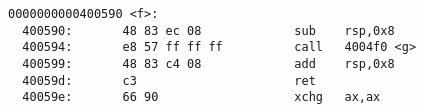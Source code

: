 \begin{lstlisting}[basicstyle=\ttfamily\footnotesize,
basewidth={.5em,.3em}, frame=single]
0000000000400590 <f>:
  400590:       48 83 ec 08             sub    rsp,0x8
  400594:       e8 57 ff ff ff          call   4004f0 <g>
  400599:       48 83 c4 08             add    rsp,0x8
  40059d:       c3                      ret    
  40059e:       66 90                   xchg   ax,ax
\end{lstlisting}

